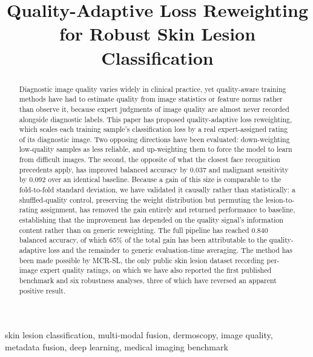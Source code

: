 \documentclass[conference]{IEEEtran}
\begin{document}
\title{Quality-Adaptive Loss Reweighting for Robust Skin Lesion Classification}

\author{
}

\maketitle

\begin{abstract}
Diagnostic image quality varies widely in clinical practice, yet quality-aware training methods have had to estimate quality from image statistics or feature norms rather than observe it, because expert judgments of image quality are almost never recorded alongside diagnostic labels. This paper has proposed quality-adaptive loss reweighting, which scales each training sample's classification loss by a real expert-assigned rating of its diagnostic image. Two opposing directions have been evaluated: down-weighting low-quality samples as less reliable, and up-weighting them to force the model to learn from difficult images. The second, the opposite of what the closest face recognition precedents apply, has improved balanced accuracy by 0.037 and malignant sensitivity by 0.092 over an identical baseline. Because a gain of this size is comparable to the fold-to-fold standard deviation, we have validated it causally rather than statistically: a shuffled-quality control, preserving the weight distribution but permuting the lesion-to-rating assignment, has removed the gain entirely and returned performance to baseline, establishing that the improvement has depended on the quality signal's information content rather than on generic reweighting. The full pipeline has reached 0.840 balanced accuracy, of which 65\% of the total gain has been attributable to the quality-adaptive loss and the remainder to generic evaluation-time averaging. The method has been made possible by MCR-SL, the only public skin lesion dataset recording per-image expert quality ratings, on which we have also reported the first published benchmark and six robustness analyses, three of which have reversed an apparent positive result.
\end{abstract}

\begin{IEEEkeywords}
skin lesion classification, multi-modal fusion, dermoscopy, image quality, metadata fusion, deep learning, medical imaging benchmark
\end{IEEEkeywords}
\end{document}

